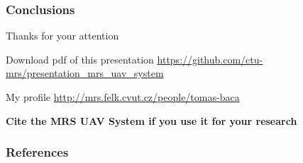 \documentclass[aspectratio=169,9pt]{beamer}
\begin{document}






\begin{frame}
  \frametitle{Conclusions}

  \begin{center}
    \huge Thanks for your attention\\
  \end{center}

  \begin{block}{Download pdf of this presentation}
    \centering
    \Large\url{https://github.com/ctu-mrs/presentation_mrs_uav_system}
  \end{block}

  \begin{block}{My profile}
    \centering
    \Large\url{http://mrs.felk.cvut.cz/people/tomas-baca}
  \end{block}

  \begin{block}{\centering \textbf{Cite the MRS UAV System if you use it for your research}}
    \small {}
  \end{block}

\end{frame}



\DeclareCiteCommand{\fullcite}
{}
{%
  \usedriver
  {%
  }
{}}
{\multicitedelim}
{}

\begin{frame}[allowframebreaks]
  \frametitle{References}
  \tiny{
    \printbibliography[heading=none,title={}]
  }
\end{frame}

\end{document}
